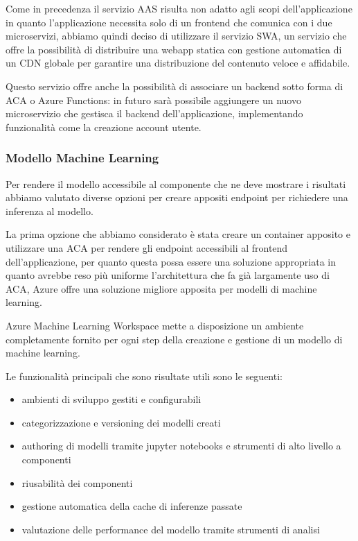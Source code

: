 Come in precedenza il servizio AAS risulta non adatto agli scopi dell'applicazione in quanto l'applicazione necessita solo di un frontend che comunica con i due microservizi, abbiamo quindi deciso di utilizzare il servizio SWA, un servizio che offre la possibilità di distribuire una webapp statica con gestione automatica di un CDN globale per garantire una distribuzione del contenuto veloce e affidabile.

Questo servizio offre anche la possibilità di associare un backend sotto forma di ACA o Azure Functions: in futuro sarà possibile aggiungere un nuovo microservizio che gestisca il backend dell'applicazione, implementando funzionalità come la creazione account utente.

\subsubsection{Modello Machine Learning}
Per rendere il modello accessibile al componente che ne deve mostrare i risultati abbiamo valutato diverse opzioni per creare appositi endpoint per richiedere una inferenza al modello.

La prima opzione che abbiamo considerato è stata creare un container apposito e utilizzare una ACA per rendere gli endpoint accessibili al frontend dell'applicazione, per quanto questa possa essere una soluzione appropriata in quanto avrebbe reso più uniforme l'architettura che fa già largamente uso di ACA, Azure offre una soluzione migliore apposita per modelli di machine learning.

Azure Machine Learning Workspace mette a disposizione un ambiente completamente fornito per ogni step della creazione e gestione di un modello di machine learning.

Le funzionalità principali che sono risultate utili sono le seguenti:
\begin{itemize}
    \item ambienti di sviluppo gestiti e configurabili
    \item categorizzazione e versioning dei modelli creati
    \item authoring di modelli tramite jupyter notebooks e strumenti di alto livello a componenti
    \item riusabilità dei componenti
    \item gestione automatica della cache di inferenze passate
    \item valutazione delle performance del modello tramite strumenti di analisi
\end{itemize}

